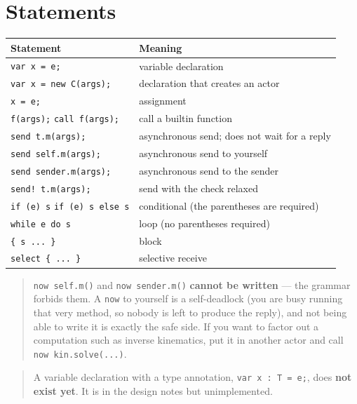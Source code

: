 \documentclass[11pt,a4paper]{article}
\begin{document}
\section{Statements}

\begin{center}
\begin{tabular}{@{}ll@{}}
\toprule
Statement & Meaning \\
\midrule
\texttt{var x = e;} & variable declaration \\
\texttt{var x = new C(args);} & declaration that creates an actor \\
\texttt{x = e;} & assignment \\
\texttt{f(args);} \quad \texttt{call f(args);} & call a builtin function \\
\texttt{send t.m(args);} & asynchronous send; does not wait for a reply \\
\texttt{send self.m(args);} & asynchronous send to yourself \\
\texttt{send sender.m(args);} & asynchronous send to the sender \\
\texttt{send! t.m(args);} & send with the check relaxed \\
\texttt{if (e) s} \quad \texttt{if (e) s else s} & conditional (the parentheses are required) \\
\texttt{while e do s} & loop (no parentheses required) \\
\texttt{\{ s ... \}} & block \\
\texttt{select \{ ... \}} & selective receive \\
\bottomrule
\end{tabular}
\end{center}

\begin{quote}\small
\texttt{now self.m()} and \texttt{now sender.m()} \textbf{cannot be written} ---
the grammar forbids them. A \texttt{now} to yourself is a self-deadlock (you are
busy running that very method, so nobody is left to produce the reply), and not
being able to write it is exactly the safe side. If you want to factor out a
computation such as inverse kinematics, put it in another actor and call
\texttt{now kin.solve(...)}.
\end{quote}

\begin{quote}\small
A variable declaration with a type annotation, \texttt{var x : T = e;}, does
\textbf{not exist yet}. It is in the design notes but unimplemented.
\end{quote}
\end{document}
